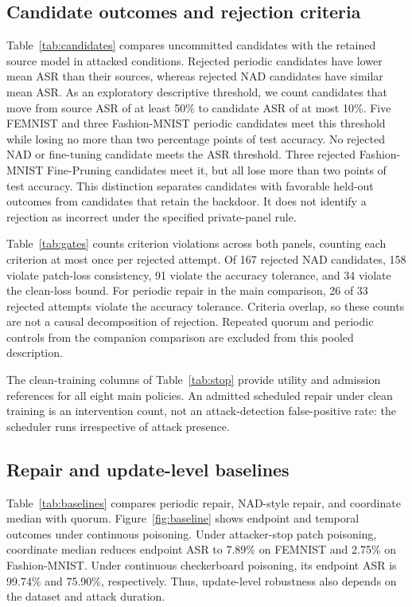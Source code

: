 \documentclass[sigconf,review,anonymous]{acmart}
\begin{document}
\subsection{Candidate outcomes and rejection criteria}
Table~\ref{tab:candidates} compares uncommitted candidates with the retained source model in attacked conditions. Rejected periodic candidates have lower mean ASR than their sources, whereas rejected NAD candidates have similar mean ASR. As an exploratory descriptive threshold, we count candidates that move from source ASR of at least 50\% to candidate ASR of at most 10\%. Five FEMNIST and three Fashion-MNIST periodic candidates meet this threshold while losing no more than two percentage points of test accuracy. No rejected NAD or fine-tuning candidate meets the ASR threshold. Three rejected Fashion-MNIST Fine-Pruning candidates meet it, but all lose more than two points of test accuracy. This distinction separates candidates with favorable held-out outcomes from candidates that retain the backdoor. It does not identify a rejection as incorrect under the specified private-panel rule.


Table~\ref{tab:gates} counts criterion violations across both panels, counting each criterion at most once per rejected attempt. Of 167 rejected NAD candidates, 158 violate patch-loss consistency, 91 violate the accuracy tolerance, and 34 violate the clean-loss bound. For periodic repair in the main comparison, 26 of 33 rejected attempts violate the accuracy tolerance. Criteria overlap, so these counts are not a causal decomposition of rejection. Repeated quorum and periodic controls from the companion comparison are excluded from this pooled description.


The clean-training columns of Table~\ref{tab:stop} provide utility and admission references for all eight main policies. An admitted scheduled repair under clean training is an intervention count, not an attack-detection false-positive rate: the scheduler runs irrespective of attack presence.

\subsection{Repair and update-level baselines}
Table~\ref{tab:baselines} compares periodic repair, NAD-style repair, and coordinate median with quorum. Figure~\ref{fig:baseline} shows endpoint and temporal outcomes under continuous poisoning. Under attacker-stop patch poisoning, coordinate median reduces endpoint ASR to 7.89\% on FEMNIST and 2.75\% on Fashion-MNIST. Under continuous checkerboard poisoning, its endpoint ASR is 99.74\% and 75.90\%, respectively. Thus, update-level robustness also depends on the dataset and attack duration.
\end{document}
